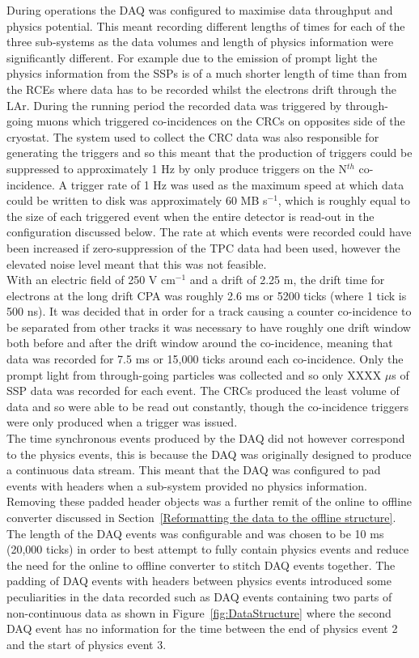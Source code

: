 During operations the DAQ was configured to maximise data throughput and physics potential. This meant recording different lengths of times for each of the three sub-systems as the data volumes and length of physics information were significantly different. For example due to the emission of prompt light the physics information from the SSPs is of a much shorter length of time than from the RCEs where data has to be recorded whilst the electrons drift through the LAr. During the running period the recorded data was triggered by through-going muons which triggered co-incidences on the CRCs on opposites side of the cryostat. The system used to collect the CRC data was also responsible for generating the triggers and so this meant that the production of triggers could be suppressed to approximately 1 Hz by only produce triggers on the N$^{th}$ co-incidence. A trigger rate of 1 Hz was used as the maximum speed at which data could be written to disk was approximately 60 MB s$^{-1}$, which is roughly equal to the size of each triggered event when the entire detector is read-out in the configuration discussed below. The rate at which events were recorded could have been increased if zero-suppression of the TPC data had been used, however the elevated noise level meant that this was not feasible. \\ 

With an electric field of 250 V cm$^{-1}$ and a drift of 2.25 m, the drift time for electrons at the long drift CPA was roughly 2.6 ms or 5200 ticks (where 1 tick is 500 ns). It was decided that in order for a track causing a counter co-incidence to be separated from other tracks it was necessary to have roughly one drift window both before and after the drift window around the co-incidence, meaning that data was recorded for 7.5 ms or 15,000 ticks around each co-incidence. Only the prompt light from through-going particles was collected and so only XXXX $\mu$s of SSP data was recorded for each event. The CRCs produced the least volume of data and so were able to be read out constantly, though the co-incidence triggers were only produced when a trigger was issued. \\

The time synchronous events produced by the DAQ did not however correspond to the physics events, this is because the DAQ was originally designed to produce a continuous data stream. This meant that the DAQ was configured to pad events with headers when a sub-system provided no physics information. Removing these padded header objects was a further remit of the online to offline converter discussed in Section~\ref{Reformatting the data to the offline structure}. The length of the DAQ events was configurable and was chosen to be 10 ms (20,000 ticks) in order to best attempt to fully contain physics events and reduce the need for the online to offline converter to stitch DAQ events together. The padding of DAQ events with headers between physics events introduced some peculiarities in the data recorded such as DAQ events containing two parts of non-continuous data as shown in Figure~\ref{fig:DataStructure} where the second DAQ event has no information for the time between the end of physics event 2 and the start of physics event 3.\\


